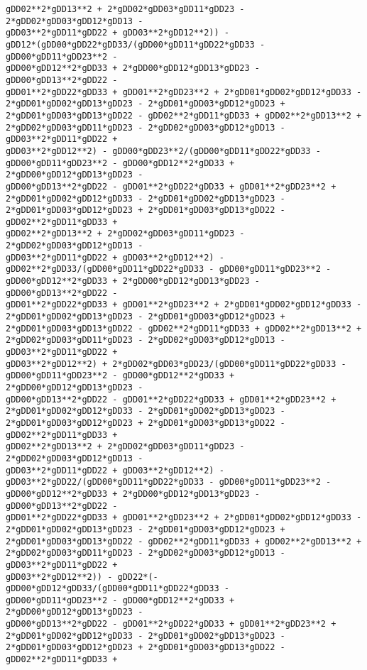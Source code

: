 \documentclass[landscape,letterpaper,10pt,english]{article}
\begin{document}
\begin{Verbatim}[commandchars=\\\{\}]
gDD02**2*gDD13**2 + 2*gDD02*gDD03*gDD11*gDD23 - 2*gDD02*gDD03*gDD12*gDD13 -
gDD03**2*gDD11*gDD22 + gDD03**2*gDD12**2)) -
gDD12*(gDD00*gDD22*gDD33/(gDD00*gDD11*gDD22*gDD33 - gDD00*gDD11*gDD23**2 -
gDD00*gDD12**2*gDD33 + 2*gDD00*gDD12*gDD13*gDD23 - gDD00*gDD13**2*gDD22 -
gDD01**2*gDD22*gDD33 + gDD01**2*gDD23**2 + 2*gDD01*gDD02*gDD12*gDD33 -
2*gDD01*gDD02*gDD13*gDD23 - 2*gDD01*gDD03*gDD12*gDD23 +
2*gDD01*gDD03*gDD13*gDD22 - gDD02**2*gDD11*gDD33 + gDD02**2*gDD13**2 +
2*gDD02*gDD03*gDD11*gDD23 - 2*gDD02*gDD03*gDD12*gDD13 - gDD03**2*gDD11*gDD22 +
gDD03**2*gDD12**2) - gDD00*gDD23**2/(gDD00*gDD11*gDD22*gDD33 -
gDD00*gDD11*gDD23**2 - gDD00*gDD12**2*gDD33 + 2*gDD00*gDD12*gDD13*gDD23 -
gDD00*gDD13**2*gDD22 - gDD01**2*gDD22*gDD33 + gDD01**2*gDD23**2 +
2*gDD01*gDD02*gDD12*gDD33 - 2*gDD01*gDD02*gDD13*gDD23 -
2*gDD01*gDD03*gDD12*gDD23 + 2*gDD01*gDD03*gDD13*gDD22 - gDD02**2*gDD11*gDD33 +
gDD02**2*gDD13**2 + 2*gDD02*gDD03*gDD11*gDD23 - 2*gDD02*gDD03*gDD12*gDD13 -
gDD03**2*gDD11*gDD22 + gDD03**2*gDD12**2) -
gDD02**2*gDD33/(gDD00*gDD11*gDD22*gDD33 - gDD00*gDD11*gDD23**2 -
gDD00*gDD12**2*gDD33 + 2*gDD00*gDD12*gDD13*gDD23 - gDD00*gDD13**2*gDD22 -
gDD01**2*gDD22*gDD33 + gDD01**2*gDD23**2 + 2*gDD01*gDD02*gDD12*gDD33 -
2*gDD01*gDD02*gDD13*gDD23 - 2*gDD01*gDD03*gDD12*gDD23 +
2*gDD01*gDD03*gDD13*gDD22 - gDD02**2*gDD11*gDD33 + gDD02**2*gDD13**2 +
2*gDD02*gDD03*gDD11*gDD23 - 2*gDD02*gDD03*gDD12*gDD13 - gDD03**2*gDD11*gDD22 +
gDD03**2*gDD12**2) + 2*gDD02*gDD03*gDD23/(gDD00*gDD11*gDD22*gDD33 -
gDD00*gDD11*gDD23**2 - gDD00*gDD12**2*gDD33 + 2*gDD00*gDD12*gDD13*gDD23 -
gDD00*gDD13**2*gDD22 - gDD01**2*gDD22*gDD33 + gDD01**2*gDD23**2 +
2*gDD01*gDD02*gDD12*gDD33 - 2*gDD01*gDD02*gDD13*gDD23 -
2*gDD01*gDD03*gDD12*gDD23 + 2*gDD01*gDD03*gDD13*gDD22 - gDD02**2*gDD11*gDD33 +
gDD02**2*gDD13**2 + 2*gDD02*gDD03*gDD11*gDD23 - 2*gDD02*gDD03*gDD12*gDD13 -
gDD03**2*gDD11*gDD22 + gDD03**2*gDD12**2) -
gDD03**2*gDD22/(gDD00*gDD11*gDD22*gDD33 - gDD00*gDD11*gDD23**2 -
gDD00*gDD12**2*gDD33 + 2*gDD00*gDD12*gDD13*gDD23 - gDD00*gDD13**2*gDD22 -
gDD01**2*gDD22*gDD33 + gDD01**2*gDD23**2 + 2*gDD01*gDD02*gDD12*gDD33 -
2*gDD01*gDD02*gDD13*gDD23 - 2*gDD01*gDD03*gDD12*gDD23 +
2*gDD01*gDD03*gDD13*gDD22 - gDD02**2*gDD11*gDD33 + gDD02**2*gDD13**2 +
2*gDD02*gDD03*gDD11*gDD23 - 2*gDD02*gDD03*gDD12*gDD13 - gDD03**2*gDD11*gDD22 +
gDD03**2*gDD12**2)) - gDD22*(-gDD00*gDD12*gDD33/(gDD00*gDD11*gDD22*gDD33 -
gDD00*gDD11*gDD23**2 - gDD00*gDD12**2*gDD33 + 2*gDD00*gDD12*gDD13*gDD23 -
gDD00*gDD13**2*gDD22 - gDD01**2*gDD22*gDD33 + gDD01**2*gDD23**2 +
2*gDD01*gDD02*gDD12*gDD33 - 2*gDD01*gDD02*gDD13*gDD23 -
2*gDD01*gDD03*gDD12*gDD23 + 2*gDD01*gDD03*gDD13*gDD22 - gDD02**2*gDD11*gDD33 +

\end{Verbatim}
\end{document}
